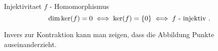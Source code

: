 \documentclass[class=article, crop=false]{standalone}
\begin{document}
\begin{zettel}{Injektivitaet}
$f$ - Homomorphismus
\[
	\dim\ker(f) = 0 \iff \ker (f) = \set{0} \iff f \text{ - injektiv }
.\]

\begin{remark}
	Invers zur Kontraktion kann man zeigen, dass die Abbildung Punkte auseinanderzieht.
\end{remark}
\end{zettel}
\end{document}
